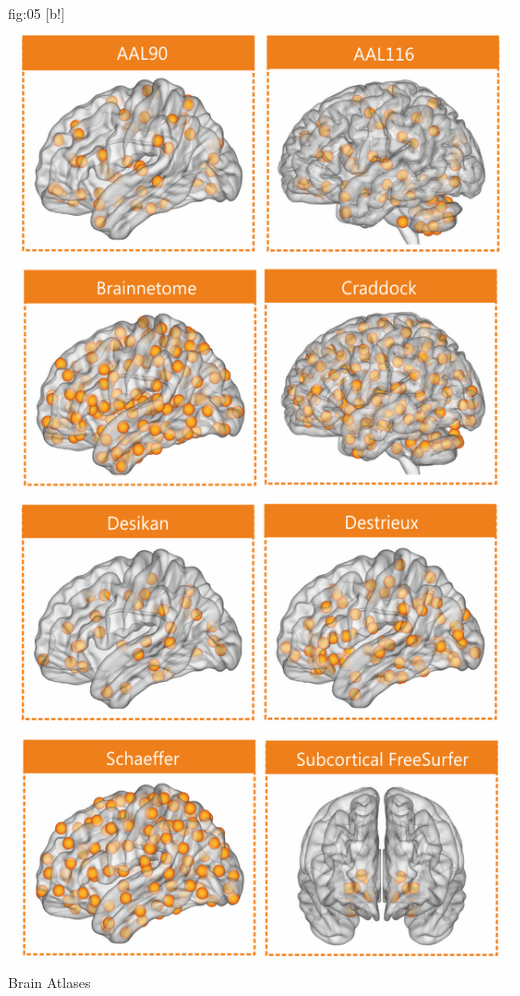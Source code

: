 \documentclass[justified]{tufte-handout}
\begin{document}
	{fig:05}
	{
	[b!]
	\includegraphics{fig05.png}
	}
	{Brain Atlases}
\end{document}

